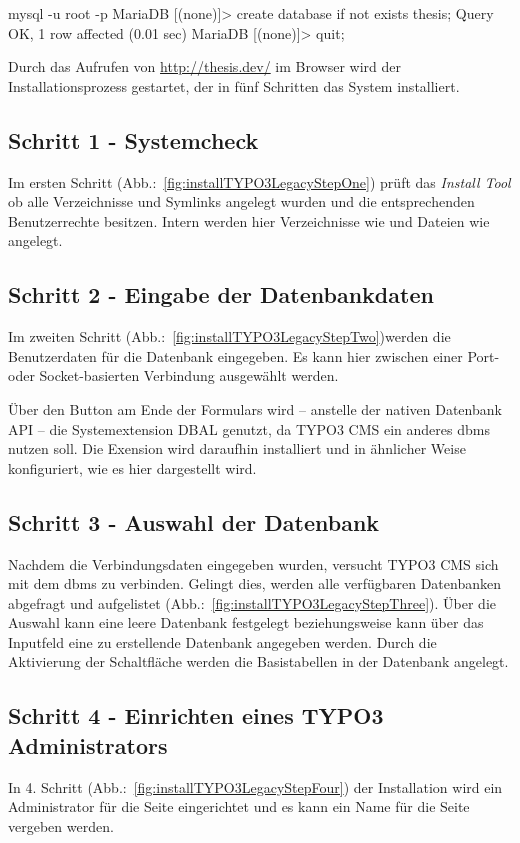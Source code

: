 \begin{shcode}
mysql -u root -p
MariaDB [(none)]> create database if not exists thesis;
Query OK, 1 row affected (0.01 sec)
	MariaDB [(none)]> quit;
	\end{shcode}

	Durch das Aufrufen von \url{http://thesis.dev/} im Browser wird der Installationsprozess gestartet, der in fünf Schritten das System installiert.

	\subsection{Schritt 1 - Systemcheck}
	Im ersten Schritt (Abb.:~\ref{fig:installTYPO3LegacyStepOne}) prüft das \textit{Install Tool} ob alle Verzeichnisse und Symlinks angelegt wurden und die entsprechenden Benutzerrechte besitzen. Intern werden hier Verzeichnisse wie  und Dateien wie  angelegt. 

	\subsection{Schritt 2 - Eingabe der Datenbankdaten}
	Im zweiten Schritt (Abb.:~\ref{fig:installTYPO3LegacyStepTwo})werden die Benutzerdaten für die Datenbank eingegeben. Es kann hier zwischen einer Port- oder Socket-basierten Verbindung ausgewählt werden.

	Über den Button am Ende der Formulars wird – anstelle der nativen Datenbank API – die Systemextension DBAL genutzt, da TYPO3 CMS ein anderes \gls{dbms} nutzen soll. Die Exension wird daraufhin installiert und in ähnlicher Weise konfiguriert, wie es hier dargestellt wird. 

	\subsection{Schritt 3 - Auswahl der Datenbank}
	Nachdem die Verbindungsdaten eingegeben wurden, versucht TYPO3 CMS sich mit dem \gls{dbms} zu verbinden. Gelingt dies, werden alle verfügbaren Datenbanken abgefragt und aufgelistet (Abb.:~\ref{fig:installTYPO3LegacyStepThree}). Über die Auswahl kann eine leere Datenbank festgelegt beziehungsweise kann über das Inputfeld eine zu erstellende Datenbank angegeben werden. Durch die Aktivierung der Schaltfläche werden die Basistabellen in der Datenbank angelegt.

	\subsection{Schritt 4 - Einrichten eines TYPO3 Administrators}
	In 4. Schritt (Abb.:~\ref{fig:installTYPO3LegacyStepFour}) der Installation wird ein Administrator für die Seite eingerichtet und es kann ein Name für die Seite vergeben werden.

